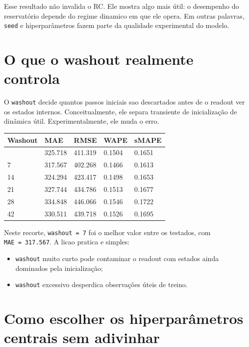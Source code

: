 \documentclass[12pt]{article}
\providecommand{\tightlist}{%
              \setlength{\itemsep}{0pt}\setlength{\parskip}{0pt}}
\begin{document}
Esse resultado não invalida o RC. Ele mostra algo mais útil: o desempenho do reservatório depende do regime dinamico em que ele opera. Em outras palavras, \texttt{seed} e hiperparâmetros fazem parte da qualidade experimental do modelo.

\section{O que o washout realmente controla}\label{12-o-que-o-washout-realmente-controla}

O \texttt{washout} decide quantos passos iniciais sao descartados antes de o readout ver os estados internos. Conceitualmente, ele separa transiente de inicialização de dinâmica útil. Experimentalmente, ele muda o erro.

\begin{longtable}[]{@{}lllll@{}}
\toprule\noalign{}
Washout & MAE & RMSE & WAPE & sMAPE \\
\midrule\noalign{}
\endhead
\bottomrule\noalign{}
\endlastfoot
0 & 325.718 & 411.319 & 0.1504 & 0.1651 \\
7 & 317.567 & 402.268 & 0.1466 & 0.1613 \\
14 & 324.294 & 423.417 & 0.1498 & 0.1653 \\
21 & 327.744 & 434.786 & 0.1513 & 0.1677 \\
28 & 334.848 & 446.066 & 0.1546 & 0.1722 \\
42 & 330.511 & 439.718 & 0.1526 & 0.1695 \\
\end{longtable}

Neste recorte, \texttt{washout\ =\ 7} foi o melhor valor entre os testados, com \texttt{MAE\ =\ 317.567}. A licao pratica e simples:

\begin{itemize}
\tightlist
\item
  \texttt{washout} muito curto pode contaminar o readout com estados ainda dominados pela inicialização;
\item
  \texttt{washout} excessivo desperdica observações úteis de treino.
\end{itemize}

\section{Como escolher os hiperparâmetros centrais sem adivinhar}\label{13-como-escolher-os-hiperparuxe2metros-centrais-sem-adivinhar}
\end{document}
